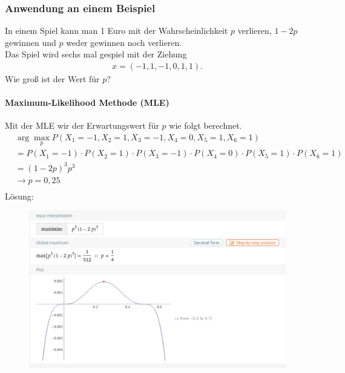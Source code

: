 \subsubsection{Anwendung an einem Beispiel}
In einem Spiel kann man 1 Euro mit der Wahrscheinlichkeit $p$ verlieren, $1-2p$ gewinnen und $p$ weder gewinnen noch verlieren.\\
Das Spiel wird sechs mal gespiel mit der Ziehung
\begin{align}
	x = (-1,1,-1,0,1,1).
\end{align}
Wie groß ist der Wert für $p$?\\

\paragraph{Maximum-Likelihood Methode (MLE)}
Mit der \gls{MLE} wir der Erwartungswert für $p$ wie folgt berechnet.
\begin{align}
	&\arg\max_{p} P(X_1=-1, X_2=1, X_3=-1,X_4=0, X_5=1, X_6=1)\\
	 &= P(X_1=-1)\cdot P(X_2=1) \cdot P(X_3=-1)\cdot P(X_4=0) \cdot P(X_5=1)\cdot P(X_6=1)\\ 
	 &= (1-2p)^3p^3 \\
	 &\rightarrow p=0,25\\
\end{align}
Lösung:

\begin{figure}[H]
	\centering
	\includegraphics[scale = 0.3]{attachment/chapter_13/Scc075}
\end{figure}


